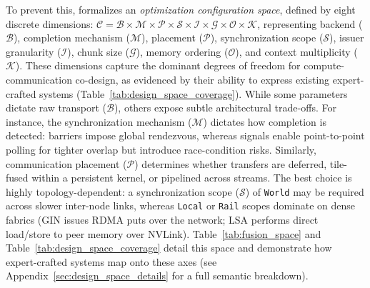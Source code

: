 To prevent this, \cufuse{} formalizes an \emph{optimization configuration space}, defined by eight discrete dimensions: $\mathcal{C} = \mathcal{B} \times \mathcal{M} \times \mathcal{P} \times \mathcal{S} \times \mathcal{I} \times \mathcal{G} \times \mathcal{O} \times \mathcal{K}$, representing backend ($\mathcal{B}$), completion mechanism ($\mathcal{M}$), placement ($\mathcal{P}$), synchronization scope ($\mathcal{S}$), issuer granularity ($\mathcal{I}$), chunk size ($\mathcal{G}$), memory ordering ($\mathcal{O}$), and context multiplicity ($\mathcal{K}$). These dimensions capture the dominant degrees of freedom for compute-communication co-design, as evidenced by their ability to express existing expert-crafted systems (Table~\ref{tab:design_space_coverage}). While some parameters dictate raw transport ($\mathcal{B}$), others expose subtle architectural trade-offs. For instance, the synchronization mechanism ($\mathcal{M}$) dictates how completion is detected: barriers impose global rendezvous, whereas signals enable point-to-point polling for tighter overlap but introduce race-condition risks. Similarly, communication placement ($\mathcal{P}$) determines whether transfers are deferred, tile-fused within a persistent kernel, or pipelined across streams. The best choice is highly topology-dependent: a synchronization scope ($\mathcal{S}$) of \texttt{World} may be required across slower inter-node links, whereas \texttt{Local} or \texttt{Rail} scopes dominate on dense fabrics (GIN issues RDMA puts over the network; LSA performs direct load/store to peer memory over NVLink). Table~\ref{tab:fusion_space} and Table~\ref{tab:design_space_coverage} detail this space and demonstrate how expert-crafted systems map onto these axes (see Appendix~\ref{sec:design_space_details} for a full semantic breakdown).


